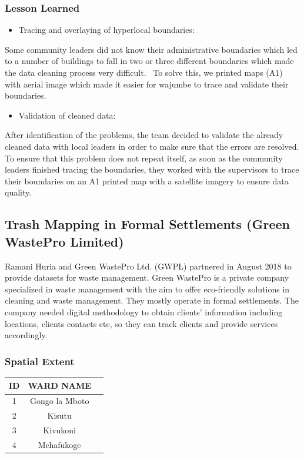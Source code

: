 \documentclass[a4paper,12pt,twoside]{article}
\begin{document}
\subsubsection{Lesson Learned}
\begin{itemize}
    \item Tracing and overlaying of hyperlocal boundaries:
\end{itemize}
Some community leaders did not know their administrative boundaries which led to a number of buildings to fall in two or three different boundaries which made the data cleaning process very difficult.
\
To solve this, we printed maps (A1) with aerial image which made it easier for wajumbe to trace and validate their boundaries. 
\begin{itemize}
    \item Validation of cleaned data:
\end{itemize}
After identification of the problems, the team decided to validate the already cleaned data with local leaders in order to make sure that the errors are resolved. To ensure that this problem does not repeat itself, as soon as the community leaders finished tracing the boundaries, they worked with the supervisors to trace their boundaries on an A1 printed map with a satellite imagery to ensure data quality. 


\newpage
\subsection{Trash Mapping in Formal Settlements (Green WastePro Limited)}

Ramani Huria and Green WastePro Ltd. (GWPL) partnered in August 2018 to provide datasets for waste management. Green WastePro is a private company specialized in waste management with the aim to offer eco-friendly solutions in cleaning and waste management. They mostly operate in formal settlements. The company needed digital methodology to obtain clients’ information including locations, clients contacts etc, so they can track clients and provide services accordingly.

\subsubsection{Spatial Extent}

\begin{center}
\begin{tabular}{|c|c|c|}
\hline
ID & WARD NAME\\
\hline
1 & Gongo la Mboto\\
\hline
2 & Kisutu\\
\hline
3 & Kivukoni\\
\hline
4 & Mchafukoge\\
 \hline
\end{tabular}
\end{center}
\end{document}
